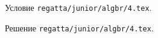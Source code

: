\problem
Условие \texttt{regatta/junior/algbr/4.tex}.

\solution Решение \texttt{regatta/junior/algbr/4.tex}.
\endproblem
